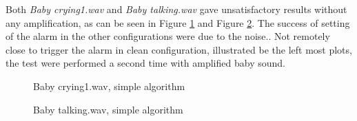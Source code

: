 Both \emph{Baby crying1.wav} and \emph{Baby talking.wav} gave unsatisfactory
results without any amplification, as can be seen in Figure \ref{fig:bc2_simp}
and Figure \ref{fig:bt_simp}. The success of setting of the alarm in the other
configurations were due to the noise.. Not remotely close to trigger the alarm
in clean configuration, illustrated be the left most plots, the test were
performed a second time with amplified baby sound.

\begin{figure}[H]
  \centering
  \caption{Baby crying1.wav, simple algorithm}
  \label{fig:bc2_simp}
\end{figure}
\begin{figure}[H]
  \centering
  \caption{Baby talking.wav, simple algorithm}
  \label{fig:bt_simp}
\end{figure}

